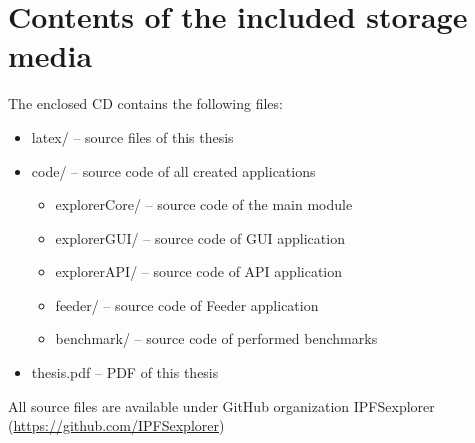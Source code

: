 
\chapter{Contents of the included storage media}

The enclosed CD contains the following files:
\begin{itemize}
    \item latex/ -- source files of this thesis
    \item code/ -- source code of all created applications
        \begin{itemize}
            \item explorerCore/ -- source code of the main module
            \item explorerGUI/ -- source code of GUI application
            \item explorerAPI/ -- source code of API application
            \item feeder/ -- source code of Feeder application
            \item benchmark/ -- source code of performed benchmarks
        \end{itemize}
    \item thesis.pdf -- PDF of this thesis
\end{itemize}
All source files are available under GitHub organization IPFSexplorer (\url{https://github.com/IPFSexplorer})
